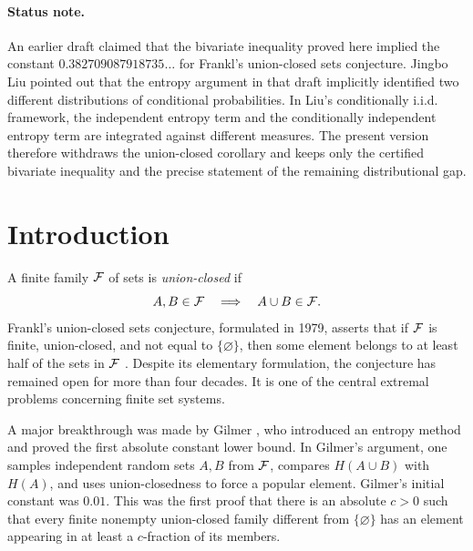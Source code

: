 \paragraph{Status note.}
An earlier draft claimed that the bivariate inequality proved here implied the
constant \(0.382709087918735\ldots\) for Frankl's union-closed sets conjecture.
Jingbo Liu pointed out that the entropy argument in that draft implicitly
identified two different distributions of conditional probabilities.  In Liu's
conditionally i.i.d. framework, the independent entropy term and the
conditionally independent entropy term are integrated against different
measures.  The present version therefore withdraws the union-closed corollary
and keeps only the certified bivariate inequality and the precise statement of
the remaining distributional gap.

\section{Introduction}

A finite family \(\mathcal{F}\) of sets is \emph{union-closed} if
\begin{equation}
  A,B\in\mathcal{F} \quad\Longrightarrow\quad A\cup B\in\mathcal{F}.
\end{equation}
Frankl's union-closed sets conjecture, formulated in 1979, asserts that if
\(\mathcal{F}\) is finite, union-closed, and not equal to \(\{\varnothing\}\), then
some element belongs to at least half of the sets in \(\mathcal{F}\)
\cite{Frankl1979,BruhnSchaudt2015}.  Despite its elementary formulation, the
conjecture has remained open for more than four decades.  It is one of the
central extremal problems concerning finite set systems.

A major breakthrough was made by Gilmer \cite{Gilmer2022}, who introduced an
entropy method and proved the first absolute constant lower bound.  In
Gilmer's argument, one samples independent random sets \(A,B\) from
\(\mathcal{F}\), compares \(H(A\cup B)\) with \(H(A)\), and uses union-closedness to
force a popular element.  Gilmer's initial constant was \(0.01\).  This was the
first proof that there is an absolute \(c>0\) such that every finite nonempty
union-closed family different from \(\{\varnothing\}\) has an element appearing
in at least a \(c\)-fraction of its members.

